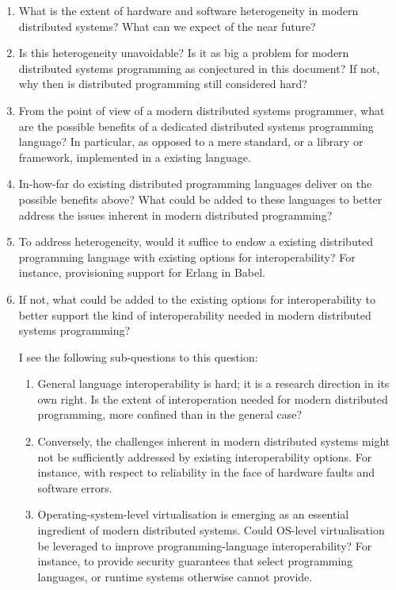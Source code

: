 \begin{enumerate}

\item What is the extent of hardware and software heterogeneity in
modern distributed systems? What can we expect of the near future?

\item Is this heterogeneity unavoidable? Is it as big a problem for
modern distributed systems programming as conjectured in this
document? If not, why then is distributed programming still considered
hard?

\item From the point of view of a modern distributed systems
programmer, what are the possible benefits of a dedicated distributed
systems programming language? In particular, as opposed to a mere
standard, or a library or framework, implemented in a existing
language.

\item In-how-far do existing distributed programming languages deliver
on the possible benefits above? What could be added to these languages
to better address the issues inherent in modern distributed
programming?

\item To address heterogeneity, would it suffice to endow a existing
distributed programming language with existing options for
interoperability? For instance, provisioning support for Erlang in
Babel.

\item If not, what could be added to the existing options for
interoperability to better support the kind of interoperability needed
in modern distributed systems programming?

I see the following sub-questions to this question:

\begin{enumerate}

\item General language interoperability is hard; it is a research
direction in its own right. Is the extent of interoperation needed for
modern distributed programming, more confined than in the general
case?

\item Conversely, the challenges inherent in modern distributed
systems might not be sufficiently addressed by existing
interoperability options. For instance, with respect to reliability in
the face of hardware faults and software errors.

\item Operating-system-level virtualisation is emerging as an
essential ingredient of modern distributed systems. Could OS-level
virtualisation be leveraged to improve programming-language
interoperability? For instance, to provide security guarantees that
select programming languages, or runtime systems otherwise cannot
provide.

\end{enumerate}

\end{enumerate}

